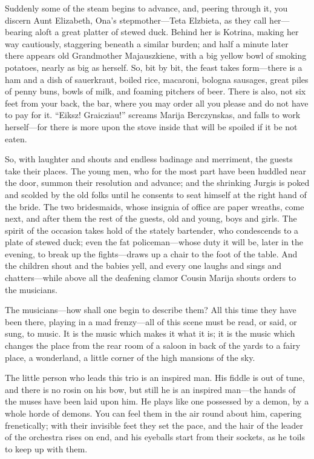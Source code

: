 \documentclass[
]{book}
\theoremstyle{definition}
\theoremstyle{definition}
\theoremstyle{definition}
\theoremstyle{definition}
\theoremstyle{remark}
\begin{document}
Suddenly some of the steam begins to advance, and, peering through it, you discern Aunt Elizabeth, Ona's stepmother---Teta Elzbieta, as they call her---bearing aloft a great platter of stewed duck. Behind her is Kotrina, making her way cautiously, staggering beneath a similar burden; and half a minute later there appears old Grandmother Majauszkiene, with a big yellow bowl of smoking potatoes, nearly as big as herself. So, bit by bit, the feast takes form---there is a ham and a dish of sauerkraut, boiled rice, macaroni, bologna sausages, great piles of penny buns, bowls of milk, and foaming pitchers of beer. There is also, not six feet from your back, the bar, where you may order all you please and do not have to pay for it. ``Eiksz! Graicziau!'' screams Marija Berczynskas, and falls to work herself---for there is more upon the stove inside that will be spoiled if it be not eaten.

So, with laughter and shouts and endless badinage and merriment, the guests take their places. The young men, who for the most part have been huddled near the door, summon their resolution and advance; and the shrinking Jurgis is poked and scolded by the old folks until he consents to seat himself at the right hand of the bride. The two bridesmaids, whose insignia of office are paper wreaths, come next, and after them the rest of the guests, old and young, boys and girls. The spirit of the occasion takes hold of the stately bartender, who condescends to a plate of stewed duck; even the fat policeman---whose duty it will be, later in the evening, to break up the fights---draws up a chair to the foot of the table. And the children shout and the babies yell, and every one laughs and sings and chatters---while above all the deafening clamor Cousin Marija shouts orders to the musicians.

The musicians---how shall one begin to describe them? All this time they have been there, playing in a mad frenzy---all of this scene must be read, or said, or sung, to music. It is the music which makes it what it is; it is the music which changes the place from the rear room of a saloon in back of the yards to a fairy place, a wonderland, a little corner of the high mansions of the sky.

The little person who leads this trio is an inspired man. His fiddle is out of tune, and there is no rosin on his bow, but still he is an inspired man---the hands of the muses have been laid upon him. He plays like one possessed by a demon, by a whole horde of demons. You can feel them in the air round about him, capering frenetically; with their invisible feet they set the pace, and the hair of the leader of the orchestra rises on end, and his eyeballs start from their sockets, as he toils to keep up with them.
\end{document}
